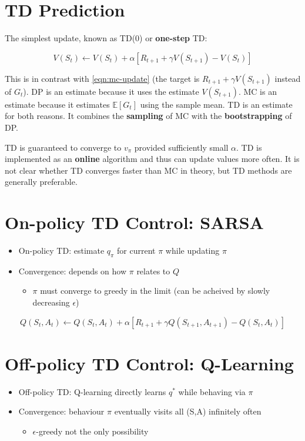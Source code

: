 \documentclass[11pt]{report}
\begin{document}
\section{TD Prediction}
The simplest update, known as TD(0) or \textbf{one-step} TD:

\begin{equation}
	\label{eqn:td-0}
	V(S_t) \xleftarrow{} V(S_t) + \alpha\left[R_{t+1} + \gamma V(S_{t+1}) - V(S_t)\right]
\end{equation}

This is in contrast with \autoref{eqn:mc-update} (the target is $R_{t+1} + \gamma V(S_{t+1})$ instead of $G_t$). DP is an estimate because it uses the estimate $V(S_{t+1})$. MC is an estimate because it estimates $\mathbb{E}[G_t]$ using the sample mean. TD is an estimate for both reasons. It combines the \textbf{sampling} of MC with the \textbf{bootstrapping} of DP.

TD is guaranteed to converge to $v_\pi$ provided sufficiently small $\alpha$. TD is implemented as an \textbf{online} algorithm and thus can update values more often. It is not clear whether TD converges faster than MC in theory, but TD methods are generally preferable.

\section{On-policy TD Control: SARSA}\label{sec:SARSA}
\begin{itemize}
	\item On-policy TD: estimate $q_\pi$ for current $\pi$ while updating $\pi$
	\item Convergence: depends on how $\pi$ relates to $Q$
	\begin{itemize}
		\item $\pi$ must converge to greedy in the limit (can be acheived by slowly decreasing $\epsilon$)
	\end{itemize}
\end{itemize}

\begin{equation}
	\label{eqn:SARSA}
	Q(S_t, A_t) \xleftarrow{} Q(S_t, A_t) + \alpha \left[ R_{t+1} + \gamma Q(S_{t+1},A_{t+1}) - Q(S_t, A_t) \right]
\end{equation}

\section{Off-policy TD Control: Q-Learning}\label{par:Q-Learning}
\begin{itemize}
	\item Off-policy TD: Q-learning directly learns $q^\ast$ while behaving via $\pi$
	\item Convergence: behaviour $\pi$ eventually visits all (S,A) infinitely often
	\begin{itemize}
		\item $\epsilon$-greedy not the only possibility
	\end{itemize}
\end{itemize}
\end{document}
